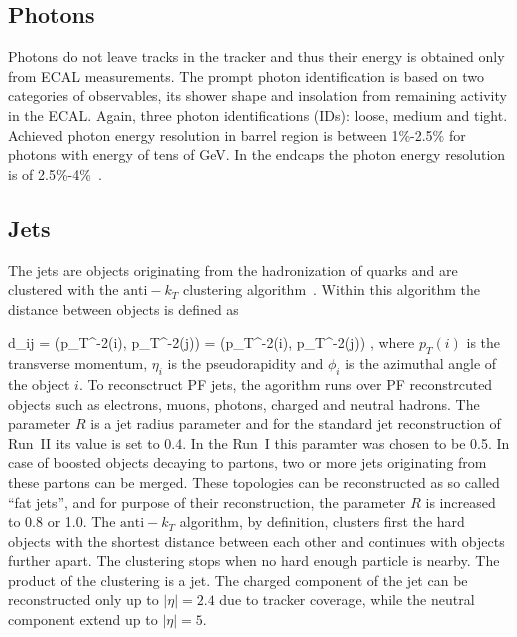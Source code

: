 

\subsection{Photons}

Photons do not leave tracks in the tracker and thus their energy is obtained only from ECAL measurements. The prompt photon identification is based on two categories of observables, its shower shape and insolation from remaining activity in the ECAL. Again, three photon identifications (IDs): loose, medium and tight. Achieved photon energy resolution in barrel region is between 1\%-2.5\% for photons with energy of tens of GeV. In the endcaps the photon energy resolution is of 2.5\%-4\%~\cite{CMS:EGM-14-001}.

\subsection{Jets}

The jets are objects originating from the hadronization of quarks and are clustered with the $\mathrm{anti-}k_{T}$ clustering algorithm~\cite{Cacciari:2008gp, Cacciari:2011ma}. Within this algorithm the distance between objects is defined as

{   
    d_{ij} = ({p_{T}}^{-2}(i), {p_{T}}^{-2}(j))  =  ({p_{T}}^{-2}(i), {p_{T}}^{-2}(j)) ,
}
where $p_{T}(i)$ is the transverse momentum, $\eta_{i}$ is the pseudorapidity and $\phi_{i}$ is the azimuthal angle of the object $i$. To reconsctruct PF jets, the agorithm runs over PF reconstrcuted objects such as electrons, muons, photons, charged and neutral hadrons. The parameter $R$ is a jet radius parameter and for the standard jet reconstruction of Run~II its value is set to 0.4. In the Run~I this paramter was chosen to be 0.5. In case of boosted objects decaying to partons, two or more jets originating from these partons can be merged. These topologies can be reconstructed as so called ``fat jets'', and for purpose of their reconstruction, the parameter $R$ is increased to 0.8 or 1.0. The $\mathrm{anti-}k_{T}$ algorithm, by definition, clusters first the hard objects with the shortest distance between each other and continues with objects further apart. The clustering stops when no hard enough particle is nearby. The product of the clustering is a jet. The charged component of the jet can be reconstructed only up to $|\eta|=2.4$ due to tracker coverage, while the neutral component extend up to  $|\eta|=5$.

